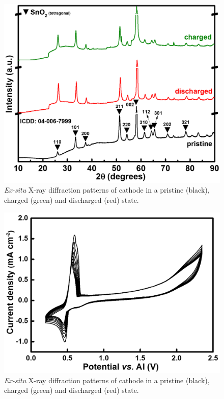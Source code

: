  \begin{figure}[th!]
  \centering
  \includegraphics[width=\textwidth]{Figures/chap6fig/SnO2XRD}
    \caption{\textit{Ex-situ} X-ray diffraction patterns of  cathode in a pristine (black), charged (green) and discharged (red) state.}
  \label{Figures/chap6fig:SnO2XRD}
\end{figure}

 \begin{figure}[th!]
  \centering
  \includegraphics[width=\textwidth]{Figures/chap6fig/Sno2CV}
    \caption{\textit{Ex-situ} X-ray diffraction patterns of  cathode in a pristine (black), charged (green) and discharged (red) state.}
  \label{Figures/chap6fig:Sno2CV}
\end{figure}

